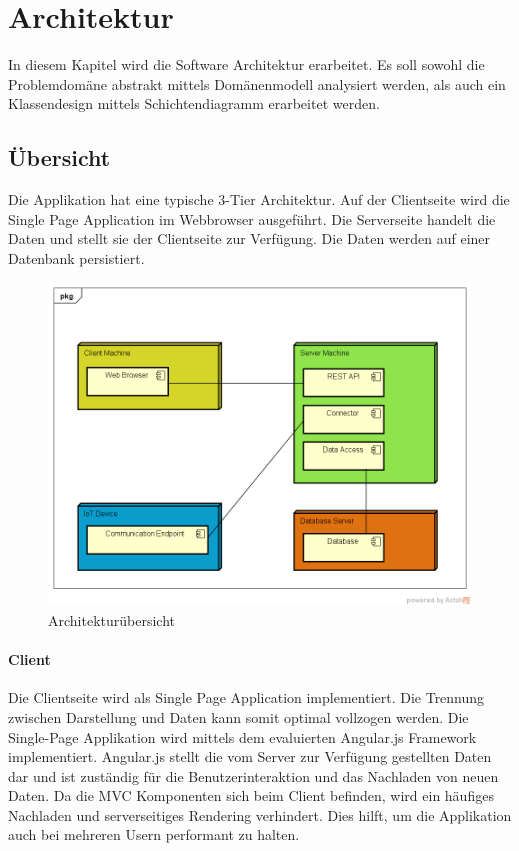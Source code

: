 \chapter{Architektur}
In diesem Kapitel wird die Software Architektur erarbeitet.  
Es soll sowohl die Problemdomäne abstrakt mittels Domänenmodell analysiert werden, als auch ein Klassendesign mittels Schichtendiagramm erarbeitet werden.

\section{Übersicht}
Die Applikation hat eine typische 3-Tier Architektur. Auf der Clientseite wird die Single Page Application im Webbrowser ausgeführt. Die Serverseite handelt die Daten und stellt sie der Clientseite zur Verfügung. Die Daten werden auf einer Datenbank persistiert.
\begin{figure}[H]
\center
\includegraphics[scale=0.6]{images/architekturuebersicht}\caption{Architekturübersicht}
\end{figure}
\subsubsection{Client}
Die Clientseite wird als Single Page Application implementiert. Die Trennung zwischen Darstellung und Daten kann somit optimal vollzogen werden. Die Single-Page Applikation wird mittels dem evaluierten Angular.js Framework implementiert. Angular.js stellt die vom Server zur Verfügung gestellten Daten dar und ist zuständig für die Benutzerinteraktion und das Nachladen von neuen Daten. Da die MVC Komponenten sich beim Client befinden, wird ein häufiges Nachladen und serverseitiges Rendering verhindert. Dies hilft, um die Applikation auch bei mehreren Usern performant zu halten.
